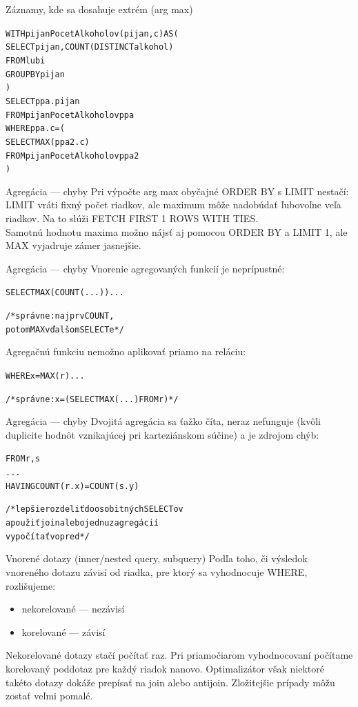 \documentclass[12pt]{beamer}
\def\blue#1{\textcolor{Cerulean}{#1}}
\begin{document}
\begin{frame}[fragile]{Záznamy, kde sa dosahuje extrém (arg max)}
\begin{alltt}
\alert{WITH} \blue{pijanPocetAlkoholov}(pijan, c) AS (
    SELECT pijan, COUNT(DISTINCT alkohol)
    FROM lubi
    GROUP BY pijan
)
SELECT ppa.pijan
FROM \blue{pijanPocetAlkoholov} ppa
WHERE ppa.c = (
    SELECT MAX(ppa2.c)
    FROM \blue{pijanPocetAlkoholov} ppa2
)
\end{alltt}
\bigskip
\end{frame}

\begin{frame}[fragile]{Agregácia --- chyby}
Pri výpočte \alert{arg max} obyčajné ORDER BY s LIMIT nestačí: LIMIT vráti fixný počet riadkov, ale maximum môže nadobúdať ľubovoľne veľa riadkov.
Na to slúži \alert{FETCH FIRST 1 ROWS WITH TIES}.
\\[5mm]

Samotnú hodnotu maxima možno nájsť aj pomocou ORDER BY a LIMIT 1,
ale \alert{MAX vyjadruje zámer jasnejšie}.
\end{frame}

\begin{frame}[fragile]{Agregácia --- chyby}
Vnorenie agregovaných funkcií je neprípustné:
\begin{alltt}
SELECT \alert{MAX(COUNT(...))} ...

/* správne: najprv COUNT,
   potom MAX v ďalšom SELECTe */
\end{alltt}
\vspace{10mm}
Agregačnú funkciu nemožno aplikovať priamo na reláciu:
\begin{alltt}
WHERE x = \alert{MAX(r)} ...

/* správne: x = (SELECT MAX(...) FROM r) */
\end{alltt}
\end{frame}

\begin{frame}[fragile]{Agregácia --- chyby}
Dvojitá agregácia sa ťažko číta, neraz nefunguje (kvôli duplicite hodnôt vznikajúcej pri karteziánskom súčine) a je zdrojom chýb:
\begin{alltt}
FROM r, s
...
HAVING COUNT(r.x) = COUNT(s.y)

/* lepšie rozdeliť do osobitných SELECTov
a použiť join alebo jednu z agregácií
vypočítať vopred */
\end{alltt}
\end{frame}


\begin{frame}[fragile]{Vnorené dotazy (inner/nested query, subquery)}
Podľa toho, či výsledok vnoreného dotazu závisí od riadka, pre ktorý sa vyhodnocuje WHERE, rozlišujeme:
\begin{itemize}
\item \alert{nekorelované} --- nezávisí
\item \alert{korelované} --- závisí
\end{itemize}
Nekorelované dotazy stačí počítať raz. Pri priamočiarom vyhodnocovaní počítame korelovaný poddotaz pre každý riadok nanovo.
Optimalizátor však niektoré takéto dotazy dokáže prepísať na join alebo antijoin.
Zložitejšie prípady môžu zostať veľmi pomalé.
\end{frame}
\end{document}

